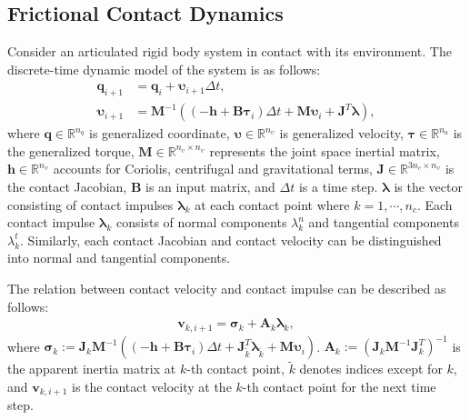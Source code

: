 \subsection{Frictional Contact Dynamics}
Consider an articulated rigid body system in contact with its environment. The discrete-time dynamic model of the system is as follows:
\begin{align}
\label{eq:dynamics}
    \mathbf{q}_{i+1} & = \mathbf{q}_i + \mathbf{\boldsymbol{\upsilon}}_{i+1}\Delta t\nonumber,\\
\mathbf{\boldsymbol{\upsilon}}_{i+1} & = \mathbf{M}^{-1}((-\mathbf{h}+\mathbf{B}\boldsymbol{\tau}_i)\Delta t + \mathbf{M}\mathbf{\boldsymbol{\upsilon}}_i+\mathbf{J}^T\bm{\lambda}),
\end{align}
 where $\mathbf{q}\in\mathbb{R}^{n_q}$ is generalized coordinate, $\boldsymbol{\upsilon}\in\mathbb{R}^{n_{\upsilon}}$ is generalized velocity, $\boldsymbol{\tau}\in\mathbb{R}^{n_a}$ is the generalized torque, $\mathbf{M}\in\mathbb{R}^{n_{\upsilon}{\times}n_{\upsilon}}$ represents the joint space inertial matrix, ${\mathbf{h}} \in\mathbb{R}^{n_{\upsilon}}$ accounts for Coriolis, centrifugal and gravitational terms, ${\mathbf{J}}\in\mathbb{R}^{3n_{c}{\times}n_{\upsilon}}$ is the contact Jacobian, $\mathbf{B}$ is an input matrix, and $\Delta t$ is a time step. ${\bm{\lambda}}$ is the vector consisting of contact impulses $\bm{\lambda}_{k}$ at each contact point where ${k=1,\cdots,n_{c}}$.  
Each contact impulse $\bm{\lambda}_{k}$ consists of normal components $\lambda^{n}_{k}$ and tangential components $\lambda^{t}_{k}$. Similarly, each contact Jacobian and contact velocity can be distinguished into normal and tangential components.

The relation between contact velocity and contact impulse can be described as follows:
\begin{align}
\label{eq:contactvel}
    \mathbf{v}_{k,i+1}=\mathbf{\sigma}_k+\mathbf{A}_{k} \bm{\lambda}_{k},
\end{align}
where $\mathbf{\sigma}_k:=\mathbf{J}_k \mathbf{M}^{-1} ((-\mathbf{h}+\mathbf{B} \boldsymbol{\tau}_i)\Delta t +\mathbf{J}_{\tilde{k}}^T \bm{\lambda}_{\tilde{k}}+\mathbf{M} \boldsymbol{\upsilon}_i)$. 
$\mathbf{A}_{k}:=(\mathbf{J}_k \mathbf{M}^{-1} \mathbf{J}_k^T)^{-1}$ is the apparent inertia matrix at $k$-th contact point, $\tilde{k}$ denotes indices except for $k$, and $\textbf{v}_{k,i+1}$ is the contact velocity at the $k$-th contact point for the next time step.

